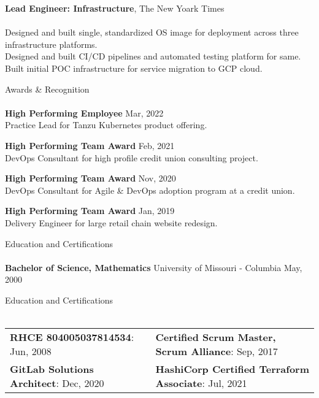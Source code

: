 \documentclass[letterpaper]{article}
\newcommand{\lineunder} {
    \vspace*{-8pt} \\
    \hspace*{-18pt} \hrulefill \\
}
\newcommand{\header} [1] {
    {\hspace*{-18pt}\vspace*{6pt} #1}
    \vspace*{-6pt} \lineunder
}
\begin{document}
{\textbf{Lead Engineer: Infrastructure}, The New Yoark Times} \\
\hspace{5mm}{\sl (Terraform, Puppet, Packer, Vault, Git, Python, Travis, Jenkins, Postgres)} \\
Designed and built single, standardized OS image for deployment across three
  infrastructure platforms. \\
Designed and built CI/CD pipelines and automated testing platform for same. \\
Built initial POC infrastructure for service migration to GCP cloud. \\
\vspace*{2mm}

\header{Awards \& Recognition}

\textbf{High Performing Employee} \hfill Mar, 2022\\
\hspace*{5mm} Practice Lead for Tanzu Kubernetes product offering.\\
\vspace*{2mm}

\textbf{High Performing Team Award} \hfill Feb, 2021\\
\hspace*{5mm} DevOps Consultant for high profile credit union consulting project.\\
\vspace*{2mm}

\textbf{High Performing Team Award} \hfill Nov, 2020\\
\hspace*{5mm} DevOps Consultant for Agile \& DevOps adoption program at a credit union.\\
\vspace*{2mm}

\textbf{High Performing Team Award} \hfill Jan, 2019\\
\hspace*{5mm} Delivery Engineer for large retail chain website redesign.\\
\vspace*{2mm}

\header{Education and Certifications}
\textbf{Bachelor of Science, Mathematics} \hfill University of Missouri - Columbia \hfill  May, 2000\\
\vspace{2mm}

\header{Education and Certifications}
\begin{tabular}{ l l }
  \textbf{RHCE 804005037814534}: Jun, 2008       & \textbf{Certified Scrum Master, Scrum Alliance}: Sep, 2017 \\
  \textbf{GitLab Solutions Architect}: Dec, 2020 & \textbf{HashiCorp Certified Terraform Associate}: Jul, 2021 \\
\end{tabular}
\vspace{2mm}
\end{document}
